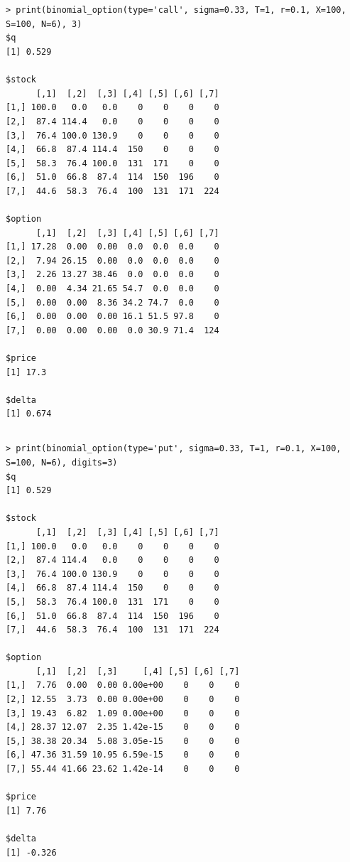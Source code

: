 \documentclass[11pt]{scrartcl}
\begin{document}
\section{}

\subsection{}

\begin{lstlisting}
> print(binomial_option(type='call', sigma=0.33, T=1, r=0.1, X=100, S=100, N=6), 3)
$q
[1] 0.529

$stock
      [,1]  [,2]  [,3] [,4] [,5] [,6] [,7]
[1,] 100.0   0.0   0.0    0    0    0    0
[2,]  87.4 114.4   0.0    0    0    0    0
[3,]  76.4 100.0 130.9    0    0    0    0
[4,]  66.8  87.4 114.4  150    0    0    0
[5,]  58.3  76.4 100.0  131  171    0    0
[6,]  51.0  66.8  87.4  114  150  196    0
[7,]  44.6  58.3  76.4  100  131  171  224

$option
      [,1]  [,2]  [,3] [,4] [,5] [,6] [,7]
[1,] 17.28  0.00  0.00  0.0  0.0  0.0    0
[2,]  7.94 26.15  0.00  0.0  0.0  0.0    0
[3,]  2.26 13.27 38.46  0.0  0.0  0.0    0
[4,]  0.00  4.34 21.65 54.7  0.0  0.0    0
[5,]  0.00  0.00  8.36 34.2 74.7  0.0    0
[6,]  0.00  0.00  0.00 16.1 51.5 97.8    0
[7,]  0.00  0.00  0.00  0.0 30.9 71.4  124

$price
[1] 17.3

$delta
[1] 0.674
\end{lstlisting}

\subsection{}

\begin{lstlisting}
> print(binomial_option(type='put', sigma=0.33, T=1, r=0.1, X=100, S=100, N=6), digits=3)
$q
[1] 0.529

$stock
      [,1]  [,2]  [,3] [,4] [,5] [,6] [,7]
[1,] 100.0   0.0   0.0    0    0    0    0
[2,]  87.4 114.4   0.0    0    0    0    0
[3,]  76.4 100.0 130.9    0    0    0    0
[4,]  66.8  87.4 114.4  150    0    0    0
[5,]  58.3  76.4 100.0  131  171    0    0
[6,]  51.0  66.8  87.4  114  150  196    0
[7,]  44.6  58.3  76.4  100  131  171  224

$option
      [,1]  [,2]  [,3]     [,4] [,5] [,6] [,7]
[1,]  7.76  0.00  0.00 0.00e+00    0    0    0
[2,] 12.55  3.73  0.00 0.00e+00    0    0    0
[3,] 19.43  6.82  1.09 0.00e+00    0    0    0
[4,] 28.37 12.07  2.35 1.42e-15    0    0    0
[5,] 38.38 20.34  5.08 3.05e-15    0    0    0
[6,] 47.36 31.59 10.95 6.59e-15    0    0    0
[7,] 55.44 41.66 23.62 1.42e-14    0    0    0

$price
[1] 7.76

$delta
[1] -0.326
\end{lstlisting}
\end{document}
